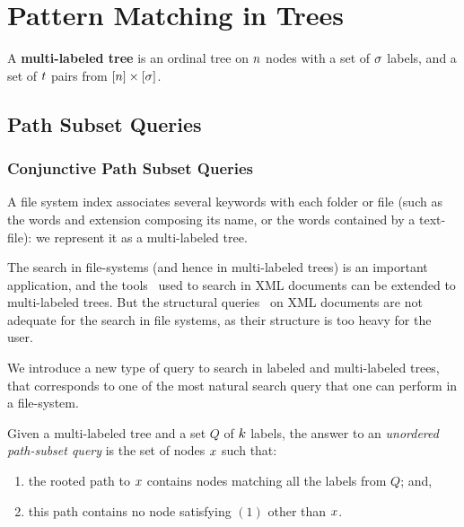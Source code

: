 
\chapter{Pattern Matching in Trees}
\label{cha:pattern-matching}


\begin{definition}
  A {\bf multi-labeled tree} is an ordinal tree on $n$ nodes
  with a set of $\sigma$ labels, and a set of $t$ pairs from
  $[n]\times[\sigma]$.
%
\end{definition}

\section{Path Subset Queries}
\label{sec:path-subset-queries}


\subsection{Conjunctive Path Subset Queries~\cite{adaptiveSearchingInSuccinctlyEncodedBinaryRelationsAndTreeStructuredDocumentsTCS}}
\label{sec:conj-quer-path}



A file system index associates several keywords with each folder or
file (such as the words and extension composing its name, or the words
contained by a text-file): we represent it as a multi-labeled tree.
%
\begin{INUTILE}
  The search in file-systems (and hence in multi-labeled trees) is an
  important application, and the
  tools~\cite{XPRESSAQueriableCompressionForXMLData,pathQueriesOnCompressedXML,comLabSchem,impLabSchem}
  used to search in XML documents can be extended to multi-labeled
  trees.
  But the structural queries~\cite{xpath,xpath2} on XML documents are
  not adequate for the search in file systems, as their structure is
  too heavy for the user.
\end{INUTILE}
% 
We introduce a new type of query to search in labeled and
multi-labeled trees, that corresponds to one of the most natural
search query that one can perform in a file-system.

\begin{definition} 
  Given a multi-labeled tree and a set $Q$ of $k$ labels,
  the answer to an {\em unordered path-subset query} is the set of
  nodes $x$ such that:
  \begin{enumerate}  
  \item the rooted path to $x$ contains nodes matching all the
    labels from $Q$; and,
  \item this path contains no node satisfying $(1)$ other than
    $x$.
\end{enumerate}
\end{definition}


